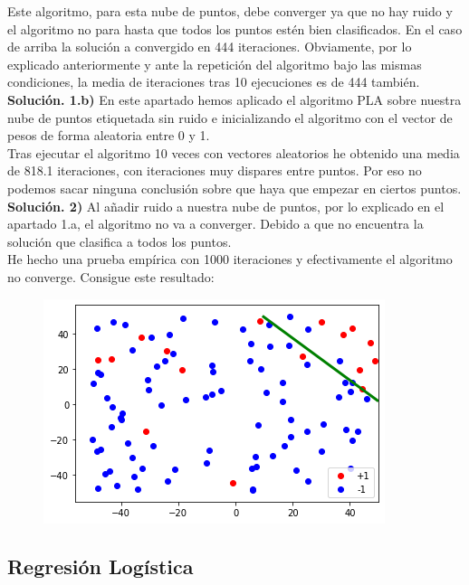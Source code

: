 \documentclass[a4paper,11pt]{article}
\begin{document}
Este algoritmo, para esta nube de puntos, debe converger ya que no hay ruido y el algoritmo no para hasta que todos los puntos estén bien clasificados. En el caso de arriba la solución a convergido en 444 iteraciones. Obviamente, por lo explicado anteriormente y ante la repetición del algoritmo bajo las mismas condiciones, la media de iteraciones tras 10 ejecuciones es de 444 también.\\

\textbf{Solución. 1.b)} En este apartado hemos aplicado el algoritmo PLA sobre nuestra nube de puntos etiquetada sin ruido e inicializando el algoritmo con el vector de pesos de forma aleatoria entre 0 y 1.\\

Tras ejecutar el algoritmo 10 veces con vectores aleatorios he obtenido una media de 818.1 iteraciones, con iteraciones muy dispares entre puntos. Por eso no podemos sacar ninguna conclusión sobre que haya que empezar en ciertos puntos.\\

\textbf{Solución. 2)} Al añadir ruido a nuestra nube de puntos, por lo explicado en el apartado 1.a, el algoritmo no va a converger. Debido a que no encuentra la solución que clasifica a todos los puntos.\\

He hecho una prueba empírica con 1000 iteraciones y efectivamente el algoritmo no converge. Consigue este resultado:

\begin{figure}[h]
\includegraphics[scale=0.7]{ej2a2}
\centering
\end{figure}

\subsection{Regresión Logística}
\end{document}
